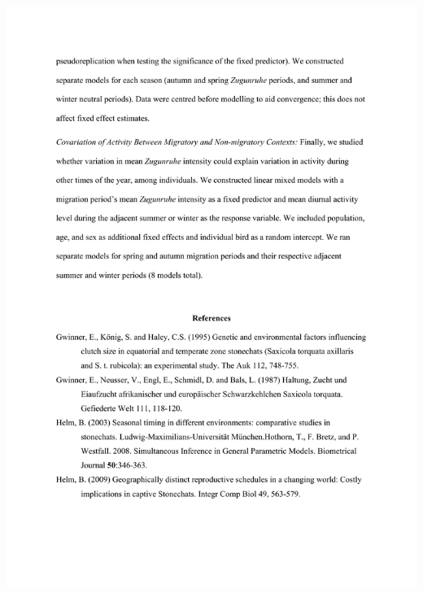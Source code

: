 \documentclass[a4paper, twoside]{templates/ociamthesis}
\begin{document}
\includegraphics[width=1\linewidth]{pdf_chapters/zug/zug_supp_crop_Part09}
\end{document}
